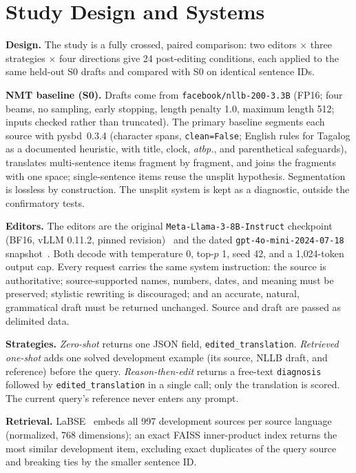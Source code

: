 \section{Study Design and Systems}
\textbf{Design.} The study is a fully crossed, paired comparison: two editors $\times$ three strategies $\times$ four directions give 24 post-editing conditions, each applied to the same held-out S0 drafts and compared with S0 on identical sentence IDs.

\textbf{NMT baseline (S0).} Drafts come from \nolinkurl{facebook/nllb-200-3.3B} (FP16; four beams, no sampling, early stopping, length penalty 1.0, maximum length 512; inputs checked rather than truncated). The primary baseline segments each source with pysbd~0.3.4 (character spans, \texttt{clean=False}; English rules for Tagalog as a documented heuristic, with title, clock, \textit{atbp.}, and parenthetical safeguards), translates multi-sentence items fragment by fragment, and joins the fragments with one space; single-sentence items reuse the unsplit hypothesis. Segmentation is lossless by construction. The unsplit system is kept as a diagnostic, outside the confirmatory tests.

\textbf{Editors.} The editors are the original \nolinkurl{Meta-Llama-3-8B-Instruct} checkpoint (BF16, vLLM 0.11.2, pinned revision)~\cite{meta2024} and the dated \nolinkurl{gpt-4o-mini-2024-07-18} snapshot~\cite{openai2024}. Both decode with temperature 0, top-$p$ 1, seed 42, and a 1{,}024-token output cap. Every request carries the same system instruction: the source is authoritative; source-supported names, numbers, dates, and meaning must be preserved; stylistic rewriting is discouraged; and an accurate, natural, grammatical draft must be returned unchanged. Source and draft are passed as delimited data.

\textbf{Strategies.} \emph{Zero-shot} returns one JSON field, \texttt{edited\_translation}. \emph{Retrieved one-shot} adds one solved development example (its source, NLLB draft, and reference) before the query. \emph{Reason-then-edit} returns a free-text \texttt{diagnosis} followed by \texttt{edited\_translation} in a single call; only the translation is scored. The current query's reference never enters any prompt.

\textbf{Retrieval.} LaBSE~\cite{feng2022} embeds all 997 development sources per source language (normalized, 768 dimensions); an exact FAISS inner-product index returns the most similar development item, excluding exact duplicates of the query source and breaking ties by the smaller sentence ID.

